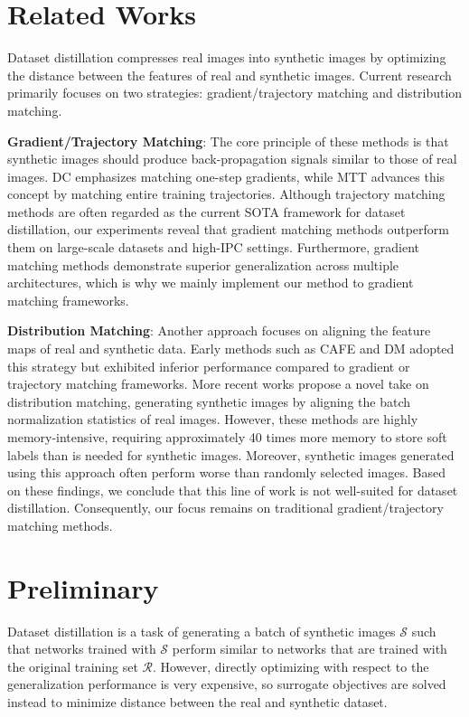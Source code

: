 \documentclass{article}
\theoremstyle{plain}
\theoremstyle{definition}
\theoremstyle{remark}
\begin{document}
\section{Related Works}
Dataset distillation compresses real images into synthetic images by optimizing the distance between the features of real and synthetic images. Current research primarily focuses on two strategies: gradient/trajectory matching and distribution matching.

\textbf{Gradient/Trajectory Matching}: The core principle of these methods is that synthetic images should produce back-propagation signals similar to those of real images. DC emphasizes matching one-step gradients, while MTT advances this concept by matching entire training trajectories. Although trajectory matching methods are often regarded as the current SOTA framework for dataset distillation, our experiments reveal that gradient matching methods outperform them on large-scale datasets and high-IPC settings. Furthermore, gradient matching methods demonstrate superior generalization across multiple architectures, which is why we mainly implement our method to gradient matching frameworks.

\textbf{Distribution Matching}: Another approach focuses on aligning the feature maps of real and synthetic data. Early methods such as CAFE and DM adopted this strategy but exhibited inferior performance compared to gradient or trajectory matching frameworks. More recent works propose a novel take on distribution matching, generating synthetic images by aligning the batch normalization statistics of real images. However, these methods are highly memory-intensive, requiring approximately 40 times more memory to store soft labels than is needed for synthetic images. Moreover, synthetic images generated using this approach often perform worse than randomly selected images. Based on these findings, we conclude that this line of work is not well-suited for dataset distillation. Consequently, our focus remains on traditional gradient/trajectory matching methods.



\section{Preliminary}

Dataset distillation is a task of generating a batch of synthetic images $\mathcal{S}$ such that networks trained with $\mathcal{S}$ perform similar to networks that are trained with the original training set $\mathcal{R}$. However, directly optimizing with respect to the generalization performance is very expensive, so surrogate objectives are solved instead to minimize distance between the real and synthetic dataset.
\end{document}
